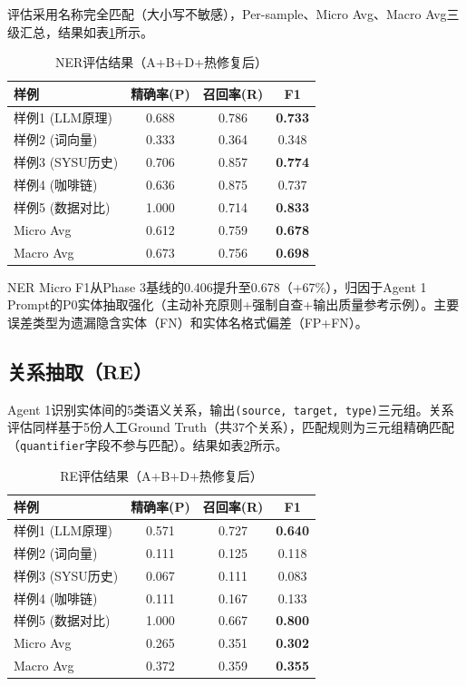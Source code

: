 \documentclass[11pt,a4paper]{article}
\begin{document}
评估采用名称完全匹配（大小写不敏感），Per-sample、Micro Avg、Macro Avg三级汇总，结果如表\ref{tab:ner}所示。

\begin{table}[H]
\centering
\caption{NER评估结果（A+B+D+热修复后）}
\label{tab:ner}
\begin{tabular}{lccc}
\toprule
样例 & 精确率(P) & 召回率(R) & F1 \\
\midrule
样例1 (LLM原理) & 0.688 & 0.786 & \textbf{0.733} \\
样例2 (词向量) & 0.333 & 0.364 & 0.348 \\
样例3 (SYSU历史) & 0.706 & 0.857 & \textbf{0.774} \\
样例4 (咖啡链) & 0.636 & 0.875 & 0.737 \\
样例5 (数据对比) & 1.000 & 0.714 & \textbf{0.833} \\
\midrule
Micro Avg & 0.612 & 0.759 & \textbf{0.678} \\
Macro Avg & 0.673 & 0.756 & \textbf{0.698} \\
\bottomrule
\end{tabular}
\end{table}

NER Micro F1从Phase 3基线的0.406提升至0.678（+67\%），归因于Agent 1 Prompt的P0实体抽取强化（主动补充原则+强制自查+输出质量参考示例）。主要误差类型为遗漏隐含实体（FN）和实体名格式偏差（FP+FN）。

\subsection{关系抽取（RE）}

Agent 1识别实体间的5类语义关系，输出\texttt{(source, target, type)}三元组。关系评估同样基于5份人工Ground Truth（共37个关系），匹配规则为三元组精确匹配（\texttt{quantifier}字段不参与匹配）。结果如表\ref{tab:re}所示。

\begin{table}[H]
\centering
\caption{RE评估结果（A+B+D+热修复后）}
\label{tab:re}
\begin{tabular}{lccc}
\toprule
样例 & 精确率(P) & 召回率(R) & F1 \\
\midrule
样例1 (LLM原理) & 0.571 & 0.727 & \textbf{0.640} \\
样例2 (词向量) & 0.111 & 0.125 & 0.118 \\
样例3 (SYSU历史) & 0.067 & 0.111 & 0.083 \\
样例4 (咖啡链) & 0.111 & 0.167 & 0.133 \\
样例5 (数据对比) & 1.000 & 0.667 & \textbf{0.800} \\
\midrule
Micro Avg & 0.265 & 0.351 & \textbf{0.302} \\
Macro Avg & 0.372 & 0.359 & \textbf{0.355} \\
\bottomrule
\end{tabular}
\end{table}
\end{document}
